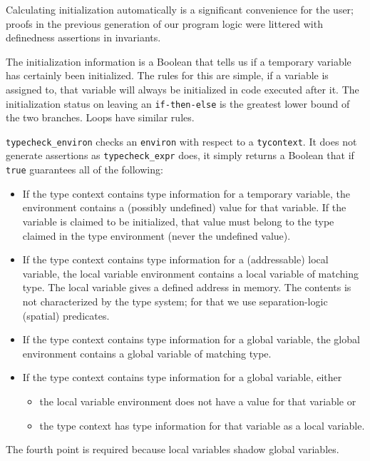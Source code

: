 \documentclass{puthesis}
\begin{document}
Calculating initialization automatically is a significant convenience
for the user; proofs in the previous generation of our program logic
were littered with definedness assertions in invariants.

The initialization information is a Boolean that tells us if a
temporary variable has certainly been initialized. The rules for this
are simple, if a variable is assigned to, that variable will always be
initialized in code executed after it.  The initialization status on
leaving an \lstinline|if-then-else| is the greatest lower bound of the
two branches. Loops have similar rules.


\lstinline|typecheck_environ| checks an \lstinline|environ| with
respect to a \lstinline|tycontext|.  It does not generate assertions
as \lstinline|typecheck_expr| does, it simply returns a Boolean that
if \lstinline{true} guarantees all of the following:

\begin{itemize}
\item If the type context contains type information for a temporary
  variable, the environment contains a (possibly undefined) value for
  that variable. If the variable is claimed to be initialized, that
  value must belong to the type claimed in the type environment (never
  the undefined value).
\item If the type context contains type information for a
  (addressable) local variable, the local variable environment
  contains a local variable of matching type. The local variable gives
  a defined address in memory.  The contents is not characterized by
  the type system; for that we use separation-logic (spatial)
  predicates.
\item If the type context contains type information for a global
  variable, the global environment contains a global variable of
  matching type. 
\item If the type context contains type information for a global
  variable, either
  \begin{itemize}
  \item the local variable environment does not have a value for that
    variable or
  \item the type context has type information for that variable as a
    local variable.
  \end{itemize}
\end{itemize}

\noindent The fourth point is required because local variables shadow global
variables.
\end{document}

